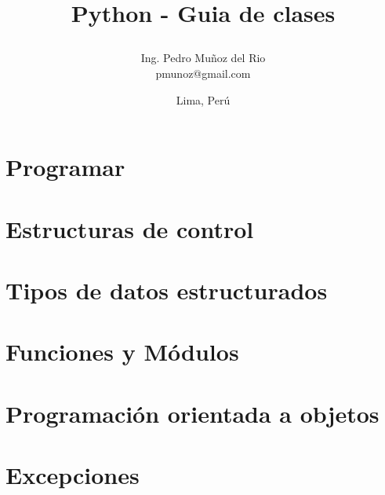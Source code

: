 \documentclass[12pt,a4paper,oneside, openany]{book}
\title{ 
 \begin{center}
  {Python - Guia de clases}\\
 \end{center}
}
\author{Ing. Pedro Muñoz del Rio\\
        pmunoz@gmail.com}
\date{Lima, Perú}
\begin{document}
\renewcommand{\baselinestretch}{1.5} %
\renewcommand{\contentsname}{Índice}
\renewcommand{\listfigurename}{Lista de Gr\'aficos}
\renewcommand{\chaptername}{Cap\'itulo}
\renewcommand{\bibname}{Fuentes de Informaci\'on}
\renewcommand{\figurename}{Gr\'afico}
\renewcommand{\tablename}{Tabla}

 \maketitle %
 
  \frontmatter  %
 
  
 \tableofcontents %
 \listoffigures   %
      
 \mainmatter  %


 \chapter{Programar}
    

 \chapter{Estructuras de control}
    
    
 \chapter{Tipos de datos estructurados}
 	
 	
 \chapter{Funciones y Módulos}
 	 		 	 	

 \chapter{Programación orientada a objetos}
 	 
 
 \chapter{Excepciones}
    
  
\end{document}

